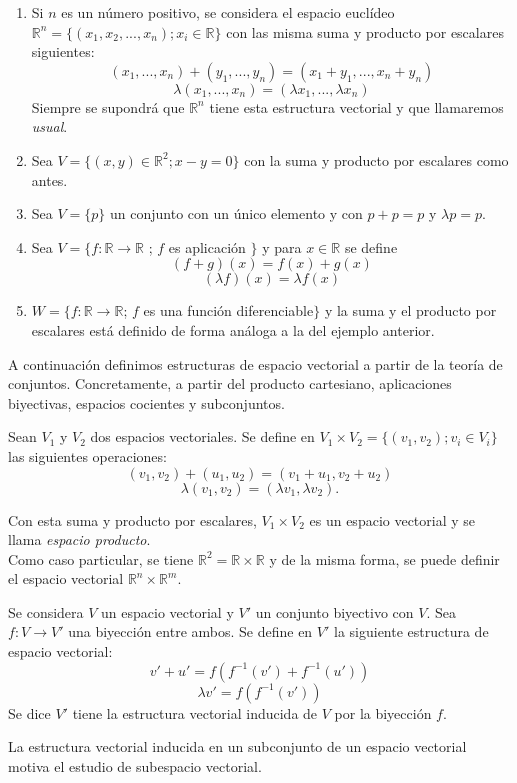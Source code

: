 		\begin{enumerate}
			\item Si $n$ es un número positivo, se considera el espacio euclídeo $\mathbb{R}^n = \{ (x_1,x_2,...,x_n) ; x_i \in \mathbb{R} \}$ con las misma suma y producto por escalares siguientes:\\
			$$ (x_1,...,x_n)+ (y_1,...,y_n)= (x_1 + y_1,...,x_n+y_n) $$
			$$\lambda (x_1,...,x_n)= (\lambda x_1,...,\lambda x_n)$$
			Siempre se supondrá que $\mathbb{R}^n$  tiene esta estructura vectorial y que llamaremos \textit{usual}.
			\item Sea $V = \{(x, y) \in \mathbb{R}^2; x - y = 0  \} $ con la suma y producto por escalares como antes.
			\item Sea $ V = \{p\} $ un conjunto con un único elemento y con $p + p = p$ y $\lambda p = p$.
			\item Sea $V =\{ f : \mathbb{R} \to \mathbb{R}$ ; $f$ es aplicación $\}$ y para $x \in \mathbb{R}$ se define
			$$(f+g)(x)=f(x)+g(x)$$
			$$(\lambda f)(x)=\lambda f(x)$$
			\item $W = \{f :\mathbb{R} \to \mathbb{R} $; $f$ es una función diferenciable$\}$ y la suma y el producto por escalares está definido de forma análoga a la del ejemplo anterior.
		\end{enumerate}
		A continuación definimos estructuras de espacio vectorial a partir de la teoría de conjuntos. Concretamente, a partir del producto cartesiano, aplicaciones biyectivas, espacios cocientes y subconjuntos.\\[0.3cm]
		\begin{defi}
			Sean $V_1$ y $ V_2$  dos espacios vectoriales. Se define en $V_1 \times V_2 = \{ (v_1,v_2); v_i \in V_i \}$ las siguientes operaciones:
			$$(v_1, v_2) + (u_1, u_2) = (v_1 + u_1, v_2 + u_2)$$
			$$\lambda (v_1, v_2) = (\lambda v_1, \lambda v_2). $$
			
			Con esta suma y producto por escalares, $V_1 \times V_2$ es un espacio vectorial y se llama \textit{espacio producto}.\\
			Como caso particular, se tiene $\mathbb{R}^2 = \mathbb{R} \times \mathbb{R}$ y de la misma forma, se puede definir el espacio vectorial $\mathbb{R}^n \times \mathbb{R}^m$.\\[0.3cm]
		\end{defi}
		
		\begin{defi}
			Se considera $V$ un espacio vectorial y $V'$ un conjunto biyectivo con $V$. Sea $f : V \to V'$ una biyección entre ambos. Se define en $V'$ la siguiente estructura de espacio vectorial:
			$$v'+ u'= f(f^{-1}(v') + f^{-1}(u'))$$
			$$\lambda v' = f(f^{-1}(v'))$$
			Se dice $V'$ tiene la estructura vectorial inducida de $V$ por la biyección $ f $.
			
			La estructura vectorial inducida en un subconjunto de un espacio vectorial motiva el estudio de subespacio vectorial.
		\end{defi}
